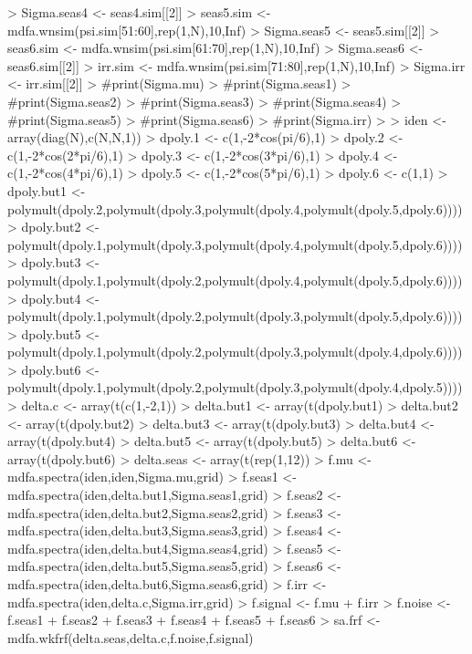 \documentclass[a4paper]{book}
\begin{document}
\begin{Schunk}
\begin{Sinput}
> Sigma.seas4 <- seas4.sim[[2]]
> seas5.sim <- mdfa.wnsim(psi.sim[51:60],rep(1,N),10,Inf)
> Sigma.seas5 <- seas5.sim[[2]]
> seas6.sim <- mdfa.wnsim(psi.sim[61:70],rep(1,N),10,Inf)
> Sigma.seas6 <- seas6.sim[[2]]
> irr.sim <- mdfa.wnsim(psi.sim[71:80],rep(1,N),10,Inf)
> Sigma.irr <- irr.sim[[2]]
> #print(Sigma.mu)
> #print(Sigma.seas1)
> #print(Sigma.seas2)
> #print(Sigma.seas3)
> #print(Sigma.seas4)
> #print(Sigma.seas5)
> #print(Sigma.seas6)
> #print(Sigma.irr)
> 
> iden <- array(diag(N),c(N,N,1))
> dpoly.1 <- c(1,-2*cos(pi/6),1)
> dpoly.2 <- c(1,-2*cos(2*pi/6),1)
> dpoly.3 <- c(1,-2*cos(3*pi/6),1)
> dpoly.4 <- c(1,-2*cos(4*pi/6),1)
> dpoly.5 <- c(1,-2*cos(5*pi/6),1)
> dpoly.6 <- c(1,1)
> dpoly.but1 <- polymult(dpoly.2,polymult(dpoly.3,polymult(dpoly.4,polymult(dpoly.5,dpoly.6))))
> dpoly.but2 <- polymult(dpoly.1,polymult(dpoly.3,polymult(dpoly.4,polymult(dpoly.5,dpoly.6))))
> dpoly.but3 <- polymult(dpoly.1,polymult(dpoly.2,polymult(dpoly.4,polymult(dpoly.5,dpoly.6))))
> dpoly.but4 <- polymult(dpoly.1,polymult(dpoly.2,polymult(dpoly.3,polymult(dpoly.5,dpoly.6))))
> dpoly.but5 <- polymult(dpoly.1,polymult(dpoly.2,polymult(dpoly.3,polymult(dpoly.4,dpoly.6))))
> dpoly.but6 <- polymult(dpoly.1,polymult(dpoly.2,polymult(dpoly.3,polymult(dpoly.4,dpoly.5))))
> delta.c <- array(t(c(1,-2,1)) %
> delta.but1 <- array(t(dpoly.but1) %
> delta.but2 <- array(t(dpoly.but2) %
> delta.but3 <- array(t(dpoly.but3) %
> delta.but4 <- array(t(dpoly.but4) %
> delta.but5 <- array(t(dpoly.but5) %
> delta.but6 <- array(t(dpoly.but6) %
> delta.seas <- array(t(rep(1,12)) %
> f.mu <- mdfa.spectra(iden,iden,Sigma.mu,grid)
> f.seas1 <- mdfa.spectra(iden,delta.but1,Sigma.seas1,grid)
> f.seas2 <- mdfa.spectra(iden,delta.but2,Sigma.seas2,grid)
> f.seas3 <- mdfa.spectra(iden,delta.but3,Sigma.seas3,grid)
> f.seas4 <- mdfa.spectra(iden,delta.but4,Sigma.seas4,grid)
> f.seas5 <- mdfa.spectra(iden,delta.but5,Sigma.seas5,grid)
> f.seas6 <- mdfa.spectra(iden,delta.but6,Sigma.seas6,grid)
> f.irr <- mdfa.spectra(iden,delta.c,Sigma.irr,grid)
> f.signal <- f.mu + f.irr
> f.noise <- f.seas1 + f.seas2 + f.seas3 + f.seas4 + f.seas5 + f.seas6
> sa.frf <- mdfa.wkfrf(delta.seas,delta.c,f.noise,f.signal)
\end{Sinput}
\end{Schunk}
\end{document}
